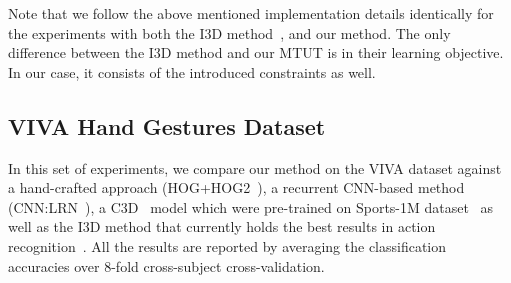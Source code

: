 \documentclass[10pt,twocolumn,letterpaper]{article}
\begin{document}
Note that we follow the above mentioned implementation details identically for the experiments with both the I3D method~\cite{carreira2017quo}, and our method.  The only difference between the I3D method and our MTUT is in their learning objective.  In our case, it consists of the introduced constraints as well.  


\iffalse
 \begin{figure}
\begin{center}
\texttt{[image: objfn.pdf]}
\end{center}
   \caption{The objective function values of different methods vs iterations.}
\label{fig:objfn}
\end{figure}
\fi


\subsection{VIVA Hand Gestures Dataset}
In this set of experiments, we compare our method on the VIVA dataset against a hand-crafted approach (HOG+HOG2~\cite{ohn2014hand}), a recurrent CNN-based method (CNN:LRN~\cite{molchanov2015hand}), a C3D~\cite{tran2015learning} model which were pre-trained on Sports-1M dataset~\cite{karpathy2014large} as well as the I3D method that currently holds the best results in action recognition~\cite{carreira2017quo}.     All the results are reported by averaging the classification accuracies over 8-fold cross-subject cross-validation.
\end{document}

